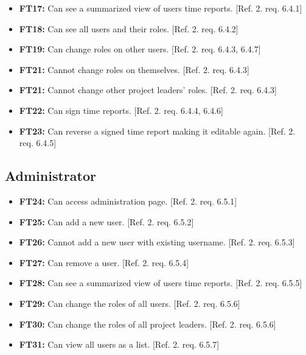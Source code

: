 \documentclass{article}
\begin{document}
			\begin{itemize}
			
			\item \textbf{FT17:} Can see a summarized view of users time reports. [Ref. 2. req. 6.4.1]
			
  			\item \textbf{FT18:} Can see all users and their roles. [Ref. 2. req. 6.4.2]

  			\item \textbf{FT19:} Can change roles on other users. [Ref. 2. req. 6.4.3, 6.4.7]
  			
  			\item \textbf{FT21:} Cannot change roles on themselves. [Ref. 2. req. 6.4.3]
  			
  			\item \textbf{FT21:} Cannot change other project leaders' roles. [Ref. 2. req. 6.4.3]
  			
  			\item \textbf{FT22:} Can sign time reports. [Ref. 2. req. 6.4.4, 6.4.6]
  			
  			\item \textbf{FT23:} Can reverse a signed time report making it editable again. [Ref. 2. req. 6.4.5]

		\end{itemize}
		
		\subsection{Administrator}
		
			\begin{itemize}
			
	
			\item \textbf{FT24:} Can access administration page. [Ref. 2. req. 6.5.1]			
			
  			\item \textbf{FT25:} Can add a new user. [Ref. 2. req. 6.5.2]
  		
  			\item \textbf{FT26:} Cannot add a new user with existing username. [Ref. 2. req. 6.5.3]

  			\item \textbf{FT27:} Can remove a user. [Ref. 2. req. 6.5.4]
  			
  			\item \textbf{FT28:} Can see a summarized view of users time reports. [Ref. 2. req. 6.5.5]  		  			
  			\item \textbf{FT29:} Can change the roles of all users. [Ref. 2. req. 6.5.6]
  			
  			\item \textbf{FT30:} Can change the roles of all project leaders. [Ref. 2. req. 6.5.6]
  			
  			\item \textbf{FT31:} Can view all users as a list. [Ref. 2. req. 6.5.7]

		\end{itemize}
		
\end{document}
